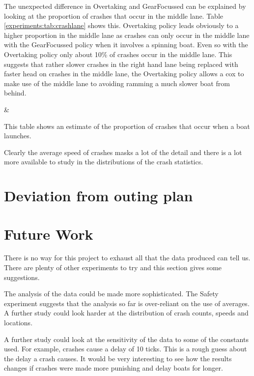   The unexpected difference in Overtaking and GearFocussed can be explained by looking at the proportion of crashes that occur in the middle lane. Table \ref{experiments:tab:crashlane} shows this. Overtaking policy leads obviously to a higher proportion in the middle lane as crashes can only occur in the middle lane with the GearFocussed policy when it involves a spinning boat. Even so with the Overtaking policy only about 10\% of crashes occur in the middle lane. This suggests that rather slower crashes in the right hand lane being replaced with faster head on crashes in the middle lane, the Overtaking policy allows a cox to make use of the middle lane to avoiding ramming a much slower boat from behind.
  
  \begin{table}[h]
  \centering
  {\cp & \middle }
  \caption{This table shows an estimate of the proportion of crashes that occur when a boat launches.}
  \label{experiments:tab:crashlane}
  \end{table}
  
 Clearly the average speed of crashes masks a lot of the detail and there is a lot more available to study in the distributions of the crash statistics.
  
\section{Deviation from outing plan}

\section{Future Work}
There is no way for this project to exhaust all that the data produced can tell us. There are plenty of other experiments to try and this section gives some suggestions.

The analysis of the data could be made more sophisticated. The Safety experiment suggests that the analysis so far is over-reliant on the use of averages. A further study could look harder at the distribution of crash counts, speeds and locations.

A further study could look at the sensitivity of the data to some of the constants used. For example, crashes cause a delay of 10 ticks. This is a rough guess about the delay a crash causes. It would be very interesting to see how the results changes if crashes were made more punishing and delay boats for longer.

